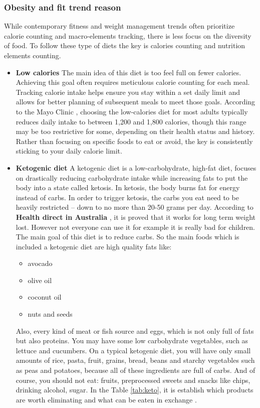 \subsubsection{Obesity and fit trend reason}
While contemporary fitness and weight management trends often prioritize calorie counting and macro-elements tracking, there is less focus on the diversity of food. To follow these type of diets the key is calories counting and nutrition elements counting. 
\begin{itemize}
    \item \textbf{Low calories}  \newline
    The main idea of this diet is too feel full on fewer calories. Achieving this goal often requires meticulous calorie counting for each meal. Tracking calorie intake helps ensure you stay within a set daily limit and allows for better planning of subsequent meals to meet those goals. According to the Mayo Clinic \cite{lowcalories}, choosing the low-calories diet for most adults typically reduces daily intake to between 1,200 and 1,800 calories, though this range may be too restrictive for some, depending on their health status and history. Rather than focusing on specific foods to eat or avoid, the key is consistently sticking to your daily calorie limit.\newline
    \item \textbf{Ketogenic diet}  \newline
    A ketogenic diet is a low-carbohydrate, high-fat diet,  focuses on drastically reducing carbohydrate intake while increasing fats to put the body into a state called ketosis. In ketosis, the body burns fat for energy instead of carbs. In order to trigger ketosis, the carbs you eat need to be heavily restricted – down to no more than 20-50 grams per day. According to \textbf{Health direct in Australia } \cite{keto1}, it is proved that it works for long term weight lost. However not everyone can use it for example it is really bad for children. The main goal of this diet is to reduce carbs.  So the main foods which is included a ketogenic diet are high quality fats like: 
    \begin{itemize}
        \item avocado 
        \item olive oil 
        \item coconut oil 
        \item nuts and seeds
    \end{itemize}
    Also, every kind of meat or fish source and eggs, which is not only full of fats but also proteins. You may have some low carbohydrate vegetables, such as lettuce and cucumbers. On a typical ketogenic diet, you will have only small amounts of rice, pasta, fruit, grains, bread, beans and starchy vegetables such as peas and potatoes, because all of these ingredients are full of carbs. And of course, you should not eat: fruits, preprocessed sweets and snacks like chips, drinking alcohol, sugar. In the Table \ref{tab:keto}, it is establish which products are worth eliminating and what can be eaten in exchange \cite{ketotable1} \cite{ketotab2}. 

\end{itemize}
